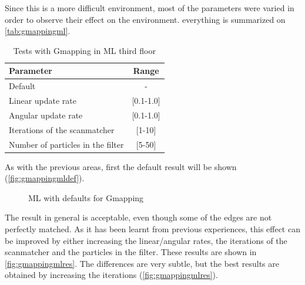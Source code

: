  Since this is a more difficult environment, most of the parameters were varied in order to observe their effect on the environment. everything is summarized on \autoref{tab:gmappingml}.
\begin{table}[h]
  \centering
  \begin{tabular}{lc}
  \hline
    \textbf{Parameter} & \textbf{Range} \\ \hline
    Default & - \\ \hline
    Linear update rate & {[}0.1-1.0{]} \\ \hline
    Angular update rate & {[}0.1-1.0{]} \\ \hline
    Iterations of the scanmatcher & {[}1-10{]} \\ \hline
    Number of particles in the filter & {[}5-50{]} \\ \hline
  \end{tabular}
  \caption{Tests with Gmapping in ML third floor}
  \label{tab:gmappingml}
\end{table}

As with the previous areas, first the default result will be shown (\autoref{fig:gmappingmldef}).
\begin{figure}[h]
  \centering
  \caption{ML with defaults for Gmapping}
  \label{fig:gmappingmldef}
\end{figure} 

The result in general is acceptable, even though some of the edges are not perfectly matched. As it has been learnt from previous experiences, this effect can be improved by either increasing the linear/angular rates, the iterations of the scanmatcher and the particles in the filter. These results are shown in \autoref{fig:gmappingmlres}. The differences are very subtle, but the best results are obtained by increasing the iterations (\autoref{fig:gmappingmlres}\protect{}).

